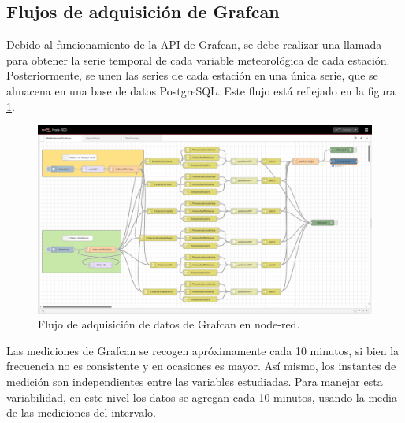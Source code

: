 \subsection{Flujos de adquisición de Grafcan}
Debido al funcionamiento de la API de Grafcan, se debe realizar una llamada para obtener la serie temporal de cada variable meteorológica de cada estación.
Posteriormente, se unen las series de cada estación en una única serie, que se almacena en una base de datos PostgreSQL. Este flujo está reflejado en la figura \ref{grafcan_flows}.
\begin{figure}[htb]
   \centering
   \includegraphics[width=1\linewidth]{images/node-red_grafcan.png}
   \caption{Flujo de adquisición de datos de Grafcan en node-red.}
   \label{grafcan_flows}
\end{figure}

Las mediciones de Grafcan se recogen apróximamente cada 10 minutos, si bien la frecuencia no es consistente y en ocasiones es mayor. Así mismo, 
los instantes de medición son independientes entre las variables estudiadas. Para manejar esta variabilidad, 
en este nivel los datos se agregan cada 10 minutos, usando la media de las mediciones del intervalo.

